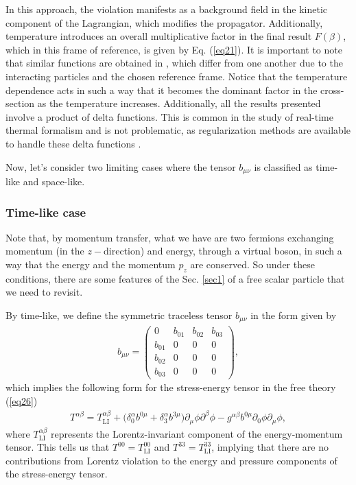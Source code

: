 \documentclass[11pt,showpacs,preprintnumbers,amsmath,amssymb,prd,nofootinbib,superscriptaddress]{revtex4-2}
\begin{document}
In this approach, the violation manifests as a background field in the kinetic component of the Lagrangian, which modifies the propagator. Additionally, temperature introduces an overall multiplicative factor in the final result $F(\beta)$, which in this frame of reference, is given by Eq. (\ref{eq21}). It is important to note that similar functions are obtained in \cite{scatter2, cabral2023violation, scatter3}, which differ from one another due to the interacting particles and the chosen reference frame.
Notice that the temperature dependence acts in such a way that it becomes the dominant factor in the cross-section as the temperature increases. Additionally, all the results presented involve a product of delta functions. This is common in the study of real-time thermal formalism and is not problematic, as regularization methods are available to handle these delta functions \cite{regdelta}.

Now, let's consider two limiting cases where the tensor $b_{\mu \nu}$ is classified as time-like and space-like.

\subsubsection{Time-like case}

Note that, by momentum transfer, what we have are two fermions exchanging momentum (in the $z-$direction) and energy, through a virtual boson, in such a way that the energy and the momentum $p_z$ are conserved. So under these conditions, there are some features of the Sec. \ref{sec1} of a free scalar particle that we need to revisit.

By time-like, we define the symmetric traceless tensor $b_{\mu \nu}$ in the form given by
\begin{eqnarray}
   b_{\mu\nu}= \begin{pmatrix}
         0 & b_{01} & b_{02} & b_{03} \\ b_{01} &0&0&0\\
          b_{02} &0&0&0\\
          b_{03} &0&0&0
    \end{pmatrix},
\end{eqnarray}
which implies the following form for the stress-energy tensor in the free theory (\ref{eq26})
\begin{eqnarray}
    T^{\alpha\beta}=T^{\alpha\beta}_{\text{LI}}+\biggl(\delta^{\alpha}_0b^{0\mu}+\delta^{\alpha}_3b^{3\mu}\biggr)\partial_\mu\phi\partial^\beta\phi-g^{\alpha\beta}b^{0\mu}\partial_0\phi\partial_\mu\phi,
\end{eqnarray}
where $T^{\alpha\beta}_{\text{LI}}$ represents the Lorentz-invariant component of the energy-momentum tensor. This tells us that $T^{00} = T^{00}_{\text{LI}}$ and $T^{33} = T^{33}_{\text{LI}}$, implying that there are no contributions from Lorentz violation to the energy and pressure components of the stress-energy tensor.
\end{document}
